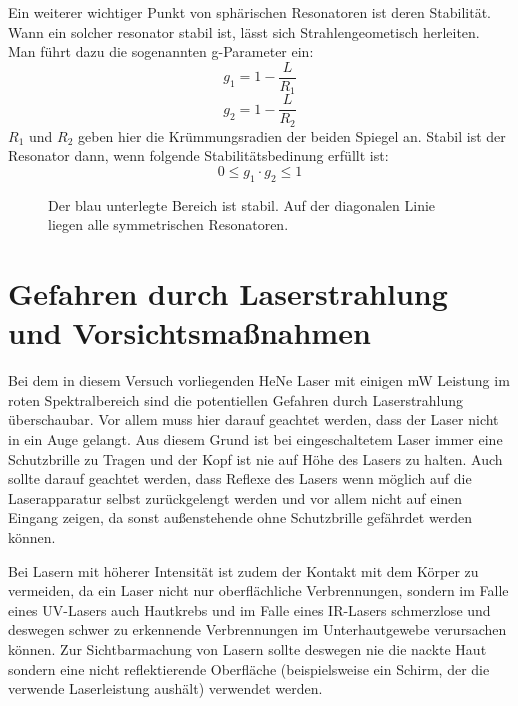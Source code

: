 \documentclass[bigchapter,colorback,accentcolor=tud4b,linedtoc,11pt]{tudreport}
\numberwithin{equation}{subsection}
\begin{document}
Ein weiterer wichtiger Punkt von sphärischen Resonatoren ist deren Stabilität. Wann ein solcher resonator stabil ist, lässt sich Strahlengeometisch herleiten. Man führt dazu die sogenannten g-Parameter ein:
$$g_1=1-\frac{L}{R_1}$$
$$g_2=1-\frac{L}{R_2}$$
$R_1$ und $R_2$ geben hier die Krümmungsradien der beiden Spiegel an. Stabil ist der Resonator dann, wenn folgende Stabilitätsbedinung erfüllt ist:
$$0\leq g_1 \cdot g_2 \leq 1$$


\begin{figure}[h]
\centering
	\caption{
		Der blau unterlegte Bereich ist stabil. Auf der diagonalen Linie liegen alle symmetrischen Resonatoren. 
	}
\end{figure}



\section{Gefahren durch Laserstrahlung und Vorsichtsmaßnahmen}
Bei dem in diesem Versuch vorliegenden HeNe Laser mit einigen mW Leistung im roten Spektralbereich sind die potentiellen Gefahren durch Laserstrahlung überschaubar. Vor allem muss hier darauf geachtet werden, dass der Laser nicht in ein Auge gelangt. Aus diesem Grund ist bei eingeschaltetem Laser immer eine Schutzbrille zu Tragen und der Kopf ist nie auf Höhe des Lasers zu halten. Auch sollte darauf geachtet werden, dass Reflexe des Lasers wenn möglich auf die Laserapparatur selbst zurückgelengt werden und vor allem nicht auf einen Eingang zeigen, da sonst außenstehende ohne Schutzbrille gefährdet werden können.

Bei Lasern mit höherer Intensität ist zudem der Kontakt mit dem Körper zu vermeiden, da ein Laser nicht nur oberflächliche Verbrennungen, sondern im Falle eines UV-Lasers auch Hautkrebs und im Falle eines IR-Lasers schmerzlose und deswegen schwer zu erkennende Verbrennungen im Unterhautgewebe verursachen können. Zur Sichtbarmachung von Lasern sollte deswegen nie die nackte Haut sondern eine nicht reflektierende Oberfläche (beispielsweise ein Schirm, der die verwende Laserleistung aushält) verwendet werden.
\end{document}
